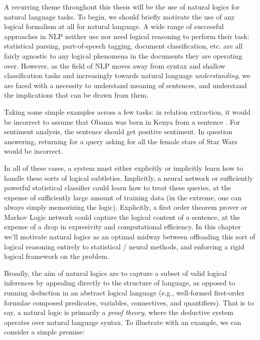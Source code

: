 A recurring theme throughout this thesis will be the use of natural
  logics for natural language tasks.
%
%
To begin, we should briefly motivate the use of any logical formalism at all
  for natural language. %
A wide range of successful approaches in NLP neither use nor need logical reasoning 
  to perform their task:
  statistical parsing, part-of-speech tagging, document classification, etc. are all
  fairly agnostic to any logical phenomena in the documents they are operating over.
However, as the field of NLP moves away from syntax and shallow classification tasks and
  increasingly towards natural language \textit{understanding}, we are faced with a
  necessity to understand meaning of sentences, and understand the implications that can
  be drawn from them.

Taking some simple examples across a few tasks: in relation extraction, it would be
  incorrect to assume that Obama was born in Kenya from a sentence .
For sentiment analysis, the sentence  should get positive sentiment.
In question answering, returning  for a query asking for all the female
  stars of Star Wars would be incorrect.

In all of these cases, a system must either explicitly or implicitly learn how to handle these
  sorts of logical subtleties.
Implicitly, a neural network or sufficiently powerful statistical classifier could learn how
  to treat these queries, at the expense of sufficiently large amount of training data
  (in the extreme, one can always simply memorizing the logic).
Explicitly, a first order theorem prover or Markov Logic network could capture the logical
  content of a sentence, at the expense of a drop in expresivity and computational
  efficiency.
In this chapter we'll motivate natural logics as an optimal midway between offloading this sort
  of logical reasoning entirely to statistical / neural methods, and enforcing a rigid
  logical framework on the problem.


%
%
Broadly, the aim of natural logics are to capture a subset of valid logical
  inferences by appealing directly to the structure of language,
  as opposed to running deduction in an abstract logical language (e.g., well-formed first-order formulae
  composed predicates, variables, connectives, and quantifiers).
That is to say, a natural logic is primarily a \textit{proof theory}, where
  the deductive system operates over natural language syntax.
To illustrate with an example, we can consider a simple premise:

